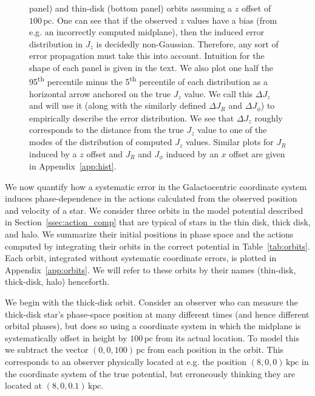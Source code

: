 \documentclass[twocolumn]{aastex62}
\newcommand{\pc}{\text{pc}}
\newcommand{\kpc}{\text{kpc}}
\newcommand{\uth}{\textsuperscript{th}}
\begin{document}
\begin{figure}
{panel) and thin-disk (bottom panel) orbits assuming a $z$ offset of
$100\,\pc$. One can see that if the observed $z$ values have a bias (from e.g.
an incorrectly computed midplane), then the induced error distribution in
$J_z$ is decidedly non-Gaussian. Therefore, any sort of error propagation must
take this into account. Intuition for the shape of each panel is given in the
text. We also plot one half the 95\uth{} percentile minus the 5\uth{}
percentile of each distribution as a horizontal arrow anchored on the true
$J_z$ value. We call this $\Delta J_z$ and will use it (along with the
similarly defined $\Delta J_R$ and $\Delta J_{\phi}$) to empirically describe
the error distribution. We see that $\Delta J_z$ roughly corresponds to the
distance from the true $J_z$ value to one of the modes of the distribution of
computed $J_z$ values. Similar plots for $J_R$ induced by a $z$ offset and
$J_R$ and $J_{\phi}$ induced by an $x$ offset are given in
Appendix~\ref{app:hist}.}
\label{fig:Jz_hist}
\end{figure}

We now quantify how a systematic error in the Galactocentric coordinate system
induces phase-dependence in the actions calculated from the observed position and velocity of a star. We consider
three orbits in the model potential described in
Section~\ref{ssec:action_comp} that are typical of stars in the thin
disk, thick disk, and halo. We summarize their initial
positions in phase space and the actions computed by integrating their orbits
in the correct potential in Table~\ref{tab:orbits}. Each orbit, integrated
without systematic coordinate errors, is plotted in Appendix~\ref{app:orbits}.
We will refer to these orbits by their names (thin-disk, thick-disk, halo)
henceforth.

We begin with the thick-disk orbit. Consider an observer who can
measure the thick-disk star's phase-space position at many different times
(and hence different orbital phases), but does so using a
coordinate system in which the midplane is systematically offset in height by
$100\,\pc$ from its actual location. To model this we subtract the vector $(0, 0,
100)\,\pc$ from each position in the orbit. This corresponds to an
observer physically located at e.g. the position $(8, 0, 0)\,\kpc$ in the
coordinate system of the true potential, but erroneously thinking they are
located at $(8, 0, 0.1)\,\kpc$.
\end{document}
